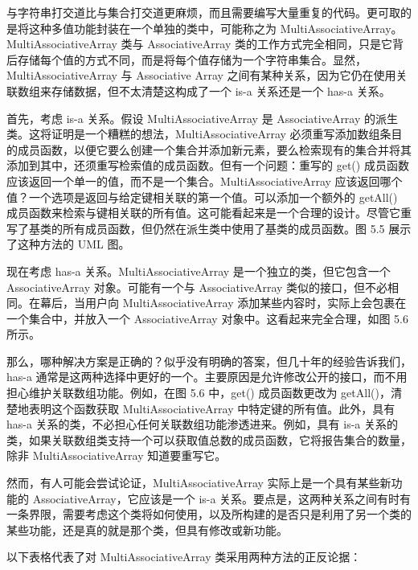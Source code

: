 与字符串打交道比与集合打交道更麻烦，而且需要编写大量重复的代码。更可取的是将这种多值功能封装在一个单独的类中，可能称之为 MultiAssociativeArray。MultiAssociativeArray 类与 AssociativeArray 类的工作方式完全相同，只是它背后存储每个值的方式不同，而是将每个值存储为一个字符串集合。显然，MultiAssociativeArray 与 Associative Array 之间有某种关系，因为它仍在使用关联数组来存储数据，但不太清楚这构成了一个 is-a 关系还是一个 has-a 关系。

首先，考虑 is-a 关系。假设 MultiAssociativeArray 是 AssociativeArray 的派生类。这将证明是一个糟糕的想法，MultiAssociativeArray 必须重写添加数组条目的成员函数，以便它要么创建一个集合并添加新元素，要么检索现有的集合并将其添加到其中，还须重写检索值的成员函数。但有一个问题：重写的 get() 成员函数应该返回一个单一的值，而不是一个集合。MultiAssociativeArray 应该返回哪个值？一个选项是返回与给定键相关联的第一个值。可以添加一个额外的 getAll() 成员函数来检索与键相关联的所有值。这可能看起来是一个合理的设计。尽管它重写了基类的所有成员函数，但仍然在派生类中使用了基类的成员函数。图 5.5 展示了这种方法的 UML 图。


现在考虑 has-a 关系。MultiAssociativeArray 是一个独立的类，但它包含一个 AssociativeArray 对象。可能有一个与 AssociativeArray 类似的接口，但不必相同。在幕后，当用户向 MultiAssociativeArray 添加某些内容时，实际上会包裹在一个集合中，并放入一个 AssociativeArray 对象中。这看起来完全合理，如图 5.6 所示。


那么，哪种解决方案是正确的？似乎没有明确的答案，但几十年的经验告诉我们，has-a 通常是这两种选择中更好的一个。主要原因是允许修改公开的接口，而不用担心维护关联数组功能。例如，在图 5.6 中，get() 成员函数更改为 getAll()，清楚地表明这个函数获取 MultiAssociativeArray 中特定键的所有值。此外，具有 has-a 关系的类，不必担心任何关联数组功能渗透进来。例如，具有 is-a 关系的类，如果关联数组类支持一个可以获取值总数的成员函数，它将报告集合的数量，除非 MultiAssociativeArray 知道要重写它。

然而，有人可能会尝试论证，MultiAssociativeArray 实际上是一个具有某些新功能的 AssociativeArray，它应该是一个 is-a 关系。要点是，这两种关系之间有时有一条界限，需要考虑这个类将如何使用，以及所构建的是否只是利用了另一个类的某些功能，还是真的就是那个类，但具有修改或新功能。

以下表格代表了对 MultiAssociativeArray 类采用两种方法的正反论据：

